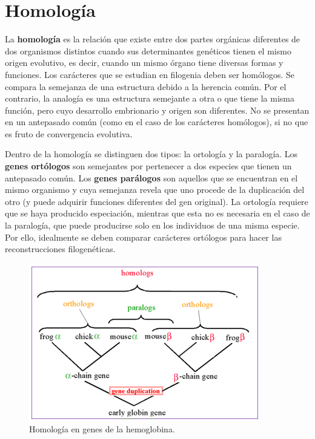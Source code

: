 \section{Homología}
La \textbf{homología} es la relación que existe entre dos partes orgánicas diferentes de dos organismos distintos cuando sus determinantes genéticos tienen el mismo origen evolutivo, es decir, cuando un mismo órgano tiene diversas formas y funciones. Los carácteres que se estudian en filogenia deben ser homólogos. Se compara la semejanza de una estructura debido a la herencia común. Por el contrario, la analogía es una estructura semejante a otra o que tiene la misma función, pero cuyo desarrollo embrionario y origen son diferentes. No se presentan en un antepasado común (como en el caso de los carácteres homólogos), si no que es fruto de convergencia evolutiva.

Dentro de la homología se distinguen dos tipos: la ortología y la paralogía. Los \textbf{genes ortólogos} son semejantes por pertenecer a dos especies que tienen un antepasado común. Los \textbf{genes parálogos} son aquellos que se encuentran en el mismo organismo y cuya semejanza revela que uno procede de la duplicación del otro (y puede adquirir funciones diferentes del gen original). La ortología requiere que se haya producido especiación, mientras que esta no es necesaria en el caso de la paralogía, que puede producirse solo en los individuos de una misma especie. Por ello, idealmente se deben comparar carácteres ortólogos para hacer las reconstrucciones filogenéticas.

\begin{figure}[htbp]
\centering
\includegraphics[width=0.5\linewidth]{figs/ortologos-paralogos.png}
\caption{Homología en genes de la hemoglobina.}
\end{figure}

